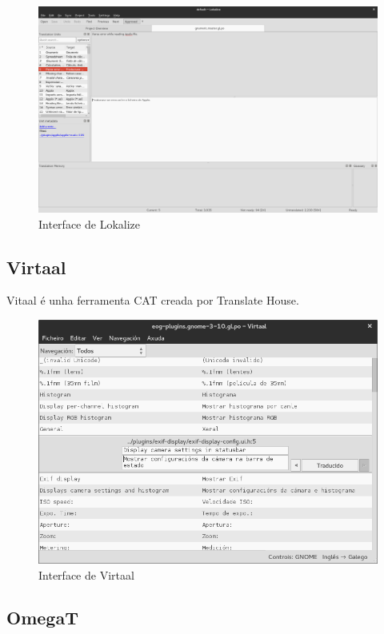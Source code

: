 \begin{figure}[h]
    \centering
    \includegraphics[width=\textwidth]{img/captura_lokalize.png}
    \caption{Interface de Lokalize}
    \label{fig:lokalize}
\end{figure}


\subsection{Virtaal}

Vitaal é unha ferramenta CAT creada por Translate House.

\begin{figure}[h]
    \centering
    \includegraphics[width=\textwidth]{img/captura_virtaal.png}
    \caption{Interface de Virtaal}
    \label{fig:virtaal}
\end{figure}

\subsection{OmegaT}

